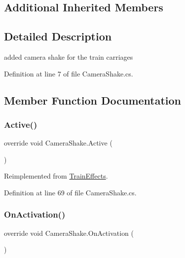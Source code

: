 \subsection*{Additional Inherited Members}


\subsection{Detailed Description}
added camera shake for the train carriages 



Definition at line 7 of file Camera\+Shake.\+cs.



\subsection{Member Function Documentation}
\mbox{\label{class_camera_shake_a386499c12399f010723509525fd0fae0}} 
\subsubsection{\texorpdfstring{Active()}{Active()}}
{\footnotesize\ttfamily override void Camera\+Shake.\+Active (\begin{DoxyParamCaption}{ }\end{DoxyParamCaption})\hspace{0.3cm}{\ttfamily [virtual]}}



Reimplemented from \mbox{\hyperlink{class_train_effects_a444cb0c6444a8945f5e1a7f02dc83b99}{Train\+Effects}}.



Definition at line 69 of file Camera\+Shake.\+cs.

\mbox{\label{class_camera_shake_a255a08f5518a42755e063a35ffe2523f}} 
\subsubsection{\texorpdfstring{On\+Activation()}{OnActivation()}}
{\footnotesize\ttfamily override void Camera\+Shake.\+On\+Activation (\begin{DoxyParamCaption}{ }\end{DoxyParamCaption})\hspace{0.3cm}{\ttfamily [virtual]}}



